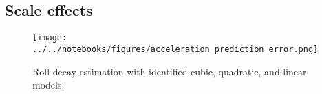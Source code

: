 \subsection{Scale effects}
\label{sec:scale_effects}
\begin{figure}[h!]
    \texttt{[image: ../../notebooks/figures/acceleration\_prediction\_error.png]}
    \caption{Roll decay estimation with identified cubic, quadratic, and linear models.}
    \label{fig:roll_decay_compare}
\end{figure}